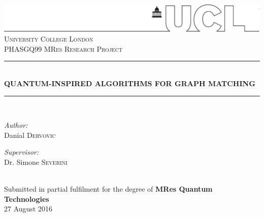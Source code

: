 \begin{titlepage}
\thispagestyle{empty}
\vspace*{-1in}\hspace*{-1.5in}\includegraphics[width=1.02\paperwidth]{UCLlogo}
\newcommand{\HRule}{\rule{\linewidth}{0.5mm}} %
\null\vfil
\center %
\\[1cm]
 \textsc{\LARGE University College London}
\\[1cm]
\textsc{\Large PHASGQ99 MRes Research Project}\\[0.5cm] %


\HRule \\[0.2cm]
{\LARGE \bfseries QUANTUM-INSPIRED ALGORITHMS FOR GRAPH MATCHING}\\[-0.2cm]
\HRule \\[1.2cm]

\begin{minipage}[t]{0.4\textwidth}
\begin{flushleft} \large
\emph{Author:}\\
Danial \textsc{Dervovic}%
\end{flushleft}
\end{minipage}
\begin{minipage}[t]{0.4\textwidth}
\begin{flushright} \large
\emph{Supervisor:} \\
Dr. Simone \textsc{Severini} \\%
\end{flushright}
\end{minipage}\\[2cm]
\large Submitted in partial fulfilment for the degree of \textbf{MRes Quantum Technologies}
\\[2.45cm]

{\large 27 August 2016}\\%


\null\vfil %
\end{titlepage}
